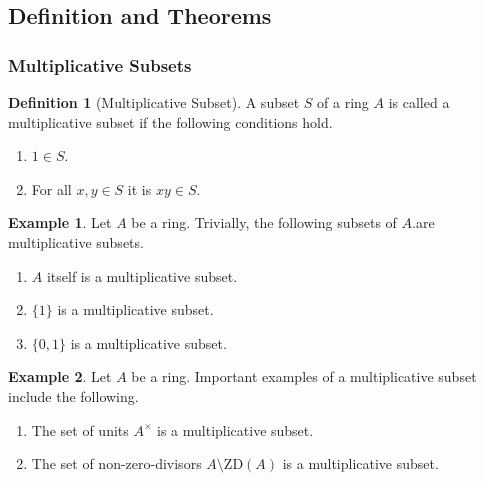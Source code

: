 \documentclass[a4paper]{book}
\theoremstyle{definition}
\newtheorem{definition}{Definition}[]
\newtheorem{example}{Example}[definition]
\begin{document}
\subsection*{Definition and Theorems}
\subsubsection{Multiplicative Subsets}


\begin{defbox}
    \begin{definition}[Multiplicative Subset]
        A subset \(S\) of a ring \(A\) is called a multiplicative subset if the following conditions hold.
        \begin{enumerate}
            \item \(1 \in S\).
            \item For all \(x, y \in S\) it is \(xy \in S\).
        \end{enumerate}
    \end{definition}
\end{defbox}

\begin{exmbox}
    \begin{example}
        Let \(A\) be a ring. Trivially, the following subsets of \(A\).are multiplicative subsets.
        \begin{enumerate}
            \item \(A\) itself is a multiplicative subset.
            \item \(\{1\}\) is a multiplicative subset.
            \item \(\{0, 1\}\) is a multiplicative subset.
        \end{enumerate}
    \end{example}
\end{exmbox}

\begin{exmbox}
    \begin{example}
        Let \(A\) be a ring. Important examples of a multiplicative subset include the following.
        \begin{enumerate}
            \item The set of units \(A^\times\) is a multiplicative subset.
            \item The set of non-zero-divisors \(A \setminus \mathrm{ZD}(A)\) is a multiplicative subset.
        \end{enumerate}
    \end{example}
\end{exmbox}
\end{document}
